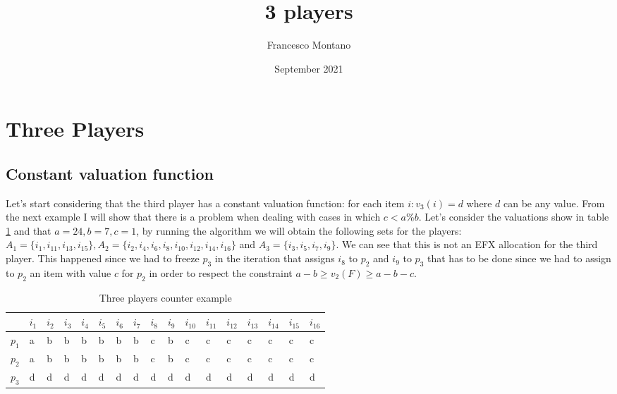 \documentclass{article}
\title{3 players}
\author{Francesco Montano}
\date{September 2021}
\begin{document}
\maketitle

\section{Three Players}
\subsection{Constant valuation function}
Let's start considering that the third player has a constant valuation function: for each item $i: v_3(i) = d$ where $d$ can be any value. From the next example I will show that there is a problem when dealing with cases in which $c < a\%b$. Let's consider the valuations show in table \ref{table:counter-example-three-players} and that $a = 24, b=7, c=1$, by running the algorithm we will obtain the following sets for the players: $A_1 = \{ i_1, i_{11}, i_{13}, i_{15}\}, A_2 = \{i_2, i_4, i_6, i_8, i_{10}, i_{12}, i_{14}, i_{16}\}$ and $A_3 = \{ i_3, i_5, i_7, i_9\}$. We can see that this is not an EFX allocation for the third player. This happened since we had to freeze $p_3$ in the iteration that assigns $i_8$ to $p_2$ and $i_9$ to $p_3$ that has to be done since we had to assign to $p_2$ an item with value $c$ for $p_2$ in order to respect the constraint $a-b\ge v_2(F) \ge a-b-c$.
\begin{table}[h]
\centering
\begin{tabular}{|l|l|l|l|l|l|l|l|l|l|l|l|l|l|l|l|l|}
\hline
      & $i_1$ & $i_2$ & $i_3$ & $i_4$ & $i_5$ & $i_6$ & $i_7$ & $i_8$ & $i_9$ & $i_{10}$ & $i_{11}$ & $i_{12}$ & $i_{13}$ & $i_{14}$ & $i_{15}$ & $i_{16}$ \\ \hline
$p_1$ & a     & b     & b     & b     & b     & b     & b     & c     & b     & c        & c        & c        & c        & c        & c        & c        \\ \hline
$p_2$ & a     & b     & b     & b     & b     & b     & b     & c     & b     & c        & c        & c        & c        & c        & c        & c        \\ \hline
$p_3$ & d     & d     & d     & d     & d     & d     & d     & d     & d     & d        & d        & d        & d        & d        & d        & d        \\ \hline
\end{tabular}
\caption{Three players counter example}
\label{table:counter-example-three-players}
\end{table}
\end{document}
